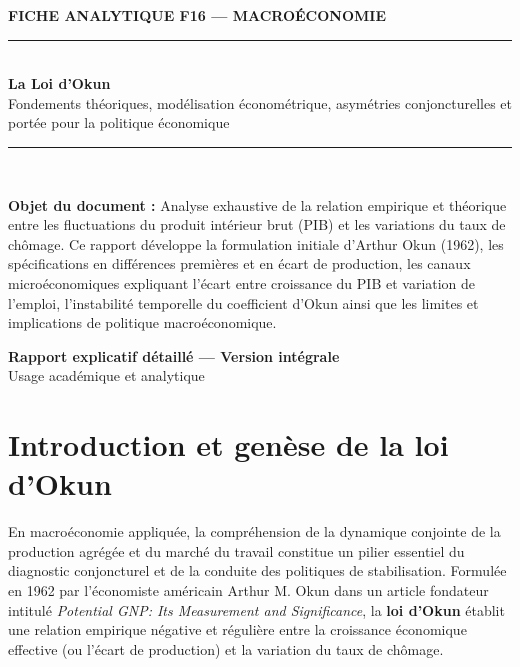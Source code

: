 \documentclass[11pt,a4paper]{article}
\begin{document}
\begin{titlepage}
    \centering
    \vspace*{1.5cm}
    {\large\bfseries\color{accent} FICHE ANALYTIQUE F16 — MACROÉCONOMIE}\\[0.5cm]
    \rule{\linewidth}{1.2pt}\\[0.8cm]
    {\Huge\bfseries\color{navy} La Loi d'Okun}\\[0.4cm]
    {\Large\color{slate} Fondements théoriques, modélisation économétrique, asymétries conjoncturelles et portée pour la politique économique}\\[1.2cm]
    \rule{\linewidth}{0.6pt}\\[1.5cm]

    \begin{minipage}{0.85\textwidth}
        \small\color{slate}
        \textbf{Objet du document :} Analyse exhaustive de la relation empirique et théorique entre les fluctuations du produit intérieur brut (PIB) et les variations du taux de chômage. Ce rapport développe la formulation initiale d'Arthur Okun (1962), les spécifications en différences premières et en écart de production, les canaux microéconomiques expliquant l'écart entre croissance du PIB et variation de l'emploi, l'instabilité temporelle du coefficient d'Okun ainsi que les limites et implications de politique macroéconomique.
    \end{minipage}

    \vfill
    {\normalsize\color{navy}\textbf{Rapport explicatif détaillé — Version intégrale}}\\[0.3cm]
    {\small\color{slate} Usage académique et analytique}
\end{titlepage}

\tableofcontents
\newpage

\section{Introduction et genèse de la loi d'Okun}

En macroéconomie appliquée, la compréhension de la dynamique conjointe de la production agrégée et du marché du travail constitue un pilier essentiel du diagnostic conjoncturel et de la conduite des politiques de stabilisation. Formulée en 1962 par l'économiste américain Arthur M. Okun dans un article fondateur intitulé \textit{Potential GNP: Its Measurement and Significance}, la \textbf{loi d'Okun} établit une relation empirique négative et régulière entre la croissance économique effective (ou l'écart de production) et la variation du taux de chômage.
\end{document}
